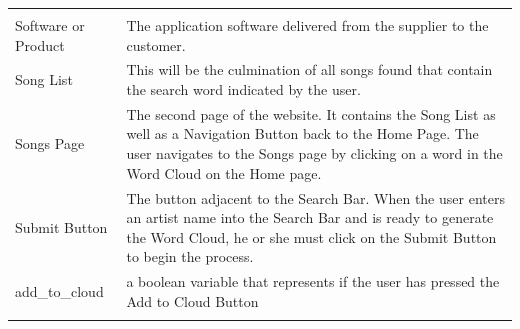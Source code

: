 \documentclass[]{article}
\begin{document}
\begin{longtable}[c]{@{}ll@{}}
\begin{minipage}[t]{0.47\columnwidth}
\end{minipage}
\\\addlinespace
\begin{minipage}[t]{0.47\columnwidth}\raggedright
Software or Product
\end{minipage} & \begin{minipage}[t]{0.47\columnwidth}\raggedright
The application software delivered from the supplier to the customer.
\end{minipage}
\\\addlinespace
\begin{minipage}[t]{0.47\columnwidth}\raggedright
Song List
\end{minipage} & \begin{minipage}[t]{0.47\columnwidth}\raggedright
This will be the culmination of all songs found that contain the search
word indicated by the user.
\end{minipage}
\\\addlinespace
\begin{minipage}[t]{0.47\columnwidth}\raggedright
Songs Page
\end{minipage} & \begin{minipage}[t]{0.47\columnwidth}\raggedright
The second page of the website. It contains the Song List as well as a
Navigation Button back to the Home Page. The user navigates to the Songs
page by clicking on a word in the Word Cloud on the Home page.
\end{minipage}
\\\addlinespace
\begin{minipage}[t]{0.47\columnwidth}\raggedright
Submit Button
\end{minipage} & \begin{minipage}[t]{0.47\columnwidth}\raggedright
The button adjacent to the Search Bar. When the user enters an artist
name into the Search Bar and is ready to generate the Word Cloud, he or she must click on the Submit Button to begin the process.
\end{minipage}
\\\addlinespace
\begin{minipage}[t]{0.47\columnwidth}\raggedright
add\_to\_cloud
\end{minipage} & \begin{minipage}[t]{0.47\columnwidth}\raggedright
a boolean variable that represents if the user has pressed the Add to Cloud Button
\end{minipage}
\\\addlinespace
\begin{minipage}[t]{0.47\columnwidth}\raggedright

\end{minipage}
\end{longtable}
\end{document}
